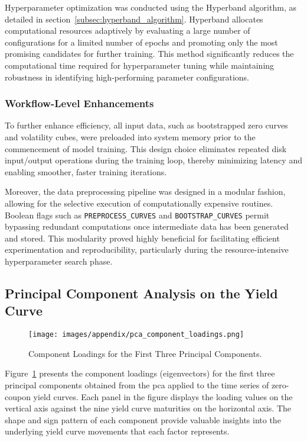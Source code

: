 Hyperparameter optimization was conducted using the Hyperband algorithm, as detailed in section~\ref{subsec:hyperband_algorithm}. Hyperband allocates computational resources adaptively by evaluating a large number of configurations for a limited number of epochs and promoting only the most promising candidates for further training. This method significantly reduces the computational time required for hyperparameter tuning while maintaining robustness in identifying high-performing parameter configurations.

\subsubsection{Workflow-Level Enhancements}
To further enhance efficiency, all input data, such as bootstrapped zero curves and volatility cubes, were preloaded into system memory prior to the commencement of model training. This design choice eliminates repeated disk input/output operations during the training loop, thereby minimizing latency and enabling smoother, faster training iterations.

Moreover, the data preprocessing pipeline was designed in a modular fashion, allowing for the selective execution of computationally expensive routines. Boolean flags such as \texttt{PREPROCESS\_CURVES} and \texttt{BOOTSTRAP\_CURVES} permit bypassing redundant computations once intermediate data has been generated and stored. This modularity proved highly beneficial for facilitating efficient experimentation and reproducibility, particularly during the resource-intensive hyperparameter search phase.

\subsection{Principal Component Analysis on the Yield Curve}
\begin{figure}[H]
	\centering
	\texttt{[image: images/appendix/pca\_component\_loadings.png]}
	\caption{Component Loadings for the First Three Principal Components.}
	\label{fig:pca_loadings}
\end{figure}

Figure~\ref{fig:pca_loadings} presents the component loadings (eigenvectors) for the first three principal components obtained from the \ac{pca} applied to the time series of zero-coupon yield curves. Each panel in the figure displays the loading values on the vertical axis against the nine yield curve maturities on the horizontal axis. The shape and sign pattern of each component provide valuable insights into the underlying yield curve movements that each factor represents.

